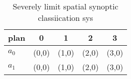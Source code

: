 \documentclass[a4paper]{article}
\begin{document}
\begin{table}
\begin{adjustbox}{width=0.8\columnwidth}
\begin{tabular}{|l|l|l|l|l|}
\hline
\textbf{plan} & \multicolumn{1}{c|}{\textbf{0}} & \multicolumn{1}{c|}{\textbf{1}} & \multicolumn{1}{c|}{\textbf{2}} & \multicolumn{1}{c|}{\textbf{3}} \\ \hline
\textbf{$a_0$}  & (0,0) & (1,0) & (2,0) & (3,0) \\ \hline
\textbf{$a_1$}  & (0,0) & (1,0) & (2,0) & (3,0) \\ \hline
\end{tabular}
\end{adjustbox}
\caption{Severely limit spatial synoptic classiication sys
}
\end{table}
\end{document}

